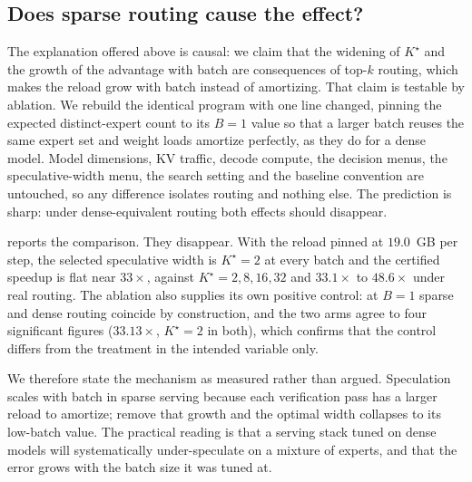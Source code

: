\subsection{Does sparse routing cause the effect?}
\label{sec:dense_control}

The explanation offered above is causal: we claim that the widening of
$K^\star$ and the growth of the advantage with batch are consequences of top-$k$
routing, which makes the reload grow with batch instead of amortizing. That
claim is testable by ablation. We rebuild the identical program with one line
changed, pinning the expected distinct-expert count to its $B=1$ value so that a
larger batch reuses the same expert set and weight loads amortize perfectly, as
they do for a dense model. Model dimensions, KV traffic, decode compute, the
decision menus, the speculative-width menu, the search setting and the baseline
convention are untouched, so any difference isolates routing and nothing else.
The prediction is sharp: under dense-equivalent routing both effects should
disappear.

 reports the comparison. They disappear. With the reload pinned
at $19.0$~GB per step, the selected speculative width is $K^\star = 2$ at every
batch and the certified speedup is flat near $33\times$, against
$K^\star = 2, 8, 16, 32$ and $33.1\times$ to $48.6\times$ under real routing.
The ablation also supplies its own positive control: at $B=1$ sparse and
dense routing coincide by construction, and the two arms agree to four
significant figures ($33.13\times$, $K^\star=2$ in both), which confirms that
the control differs from the treatment in the intended variable only.

We therefore state the mechanism as measured rather than argued. Speculation
scales with batch in sparse serving because each verification pass has a larger
reload to amortize; remove that growth and the optimal width collapses to its
low-batch value. The practical reading is that a serving stack tuned on dense
models will systematically under-speculate on a mixture of experts, and that the
error grows with the batch size it was tuned at.

